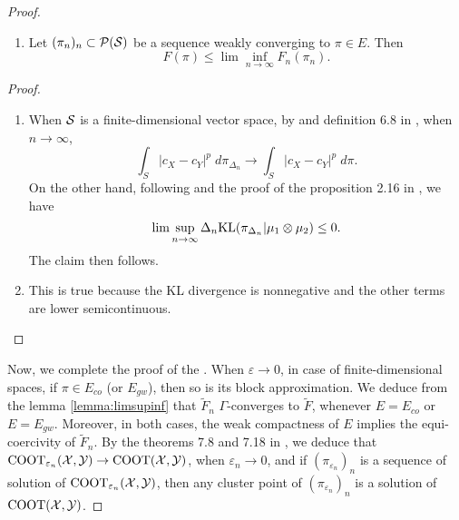 \begin{proof}
\begin{lemma}
\begin{enumerate}
        \item Let $(\pi_n)_n \subset \mathcal P(\mathcal S)$ be a sequence weakly converging to $\pi \in E$. Then
        \begin{equation}
          F(\pi) \leq \lim \inf_{n \to \infty} F_{n}(\pi_n).
        \end{equation}
      \end{enumerate}
    \end{lemma}
    \begin{proof}
      \text{ }
      \begin{enumerate}
        \item When $\mathcal S$ is a finite-dimensional vector space, by  and
        definition 6.8 in \citep{Villani08}, when $n \to \infty$,
        \begin{equation}
          \int_S \vert c_X - c_Y\vert^p \; d\pi_{\Delta_n} \to \int_S \vert c_X - c_Y\vert^p \; d\pi.
        \end{equation}
        On the other hand, following  and the proof of the proposition 2.16 in \citep{Carlier17}, we have
        \begin{equation}
          \lim\sup_{n \to \infty} \Delta_n \text{KL}(\pi_{\Delta_n} \vert \mu_1 \otimes \mu_2) \leq 0.
        \end{equation}
        The claim then follows.

        \item This is true because the KL divergence is nonnegative and the other terms are lower semicontinuous.
      \end{enumerate}
    \end{proof}
    Now, we complete the proof of the .
    When $\varepsilon \to 0$, in case of finite-dimensional spaces, if $\pi \in E_{co}$ (or $E_{gw}$), then so is its block approximation.
    We deduce from the lemma \ref{lemma:limsupinf} that $\widetilde{F}_{n}$ $\Gamma$-converges to
    $\widetilde{F}$, whenever $E = E_{co}$ or $E = E_{gw}$. Moreover, in both cases, the weak compactness of $E$ implies the equi-coercivity
    of $\widetilde{F}_n$. By the theorems 7.8 and 7.18 in \citep{Maso93}, we deduce that
    $\text{COOT}_{\varepsilon_n}(\mathcal X, \mathcal Y) \to \text{COOT}(\mathcal X, \mathcal Y)$, when $\varepsilon_n \to 0$,
    and if $(\pi_{\varepsilon_n})_{n}$ is a sequence of solution of $\text{COOT}_{\varepsilon_n}(\mathcal X, \mathcal Y)$,
    then any cluster point of $(\pi_{\varepsilon_n})_{n}$ is a solution of $\text{COOT}(\mathcal X, \mathcal Y)$.
  \end{proof}

